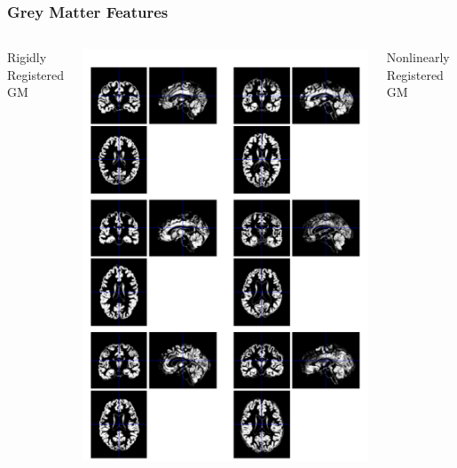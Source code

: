\documentclass{beamer}
\begin{document}
\begin{frame}
\frametitle{Grey Matter Features}
\begin{columns}[c]
Rigidly Registered GM

\includegraphics[width=1\textwidth]{gm_ixi}

Nonlinearly Registered GM


\end{columns}
\end{frame}
\end{document}
